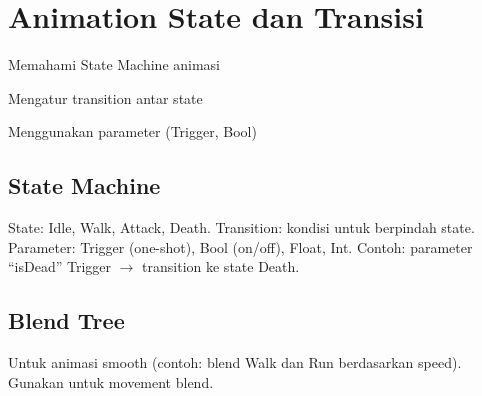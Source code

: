 \section{Animation State dan Transisi}

\begin{learningoutcomes}
\item Memahami State Machine animasi
\item Mengatur transition antar state
\item Menggunakan parameter (Trigger, Bool)
\end{learningoutcomes}

\subsection{State Machine}

State: Idle, Walk, Attack, Death. Transition: kondisi untuk berpindah state. Parameter: Trigger (one-shot), Bool (on/off), Float, Int. Contoh: parameter ``isDead'' Trigger $\rightarrow$ transition ke state Death.

\subsection{Blend Tree}

Untuk animasi smooth (contoh: blend Walk dan Run berdasarkan speed). Gunakan untuk movement blend.
